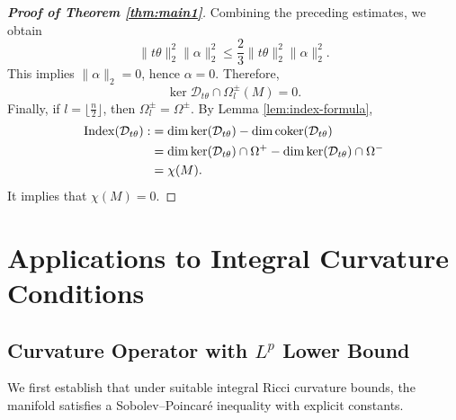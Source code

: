 \documentclass[12pt, twoside]{article}
\theoremstyle{definition}
\numberwithin{equation}{section}
\def\Om{\Omega}
\begin{document}
\begin{proof}[\textbf{Proof of Theorem \ref{thm:main1}}]
		Combining the preceding estimates, we obtain
		\[
		\|t\theta\|_2^2 \|\alpha\|_2^{2}\leq \frac{2}{3} \|t\theta\|_2^2 \|\alpha\|_2^2. \]
		This implies \(\|\alpha\|_2 = 0\), hence \(\alpha = 0\). Therefore,
		\[
		\ker\mathcal{D}_{t\theta}\cap\Omega^{\pm}_{l}(M)=0.
		\]
		Finally, if  $l=\lfloor\frac{n}{2}\rfloor$, then $\Om^{\pm}_{l}=\Om^{\pm}$. By Lemma \ref{lem:index-formula},
		\begin{equation*}
		\begin{split}
		{\rm{Index}}(\mathcal{D}_{t\theta}):&=\dim\ker(\mathcal{D}_{t\theta})-\dim\operatorname{coker}(\mathcal{D}_{t\theta})\\
		&=\dim\ker(\mathcal{D}_{t\theta})\cap\Om^{+}-\dim\operatorname{ker}(\mathcal{D}_{t\theta})\cap\Om^{-}\\
		&=\chi(M).
		\end{split}
		\end{equation*}  
		It implies that \(\chi(M) = 0\).
	\end{proof}
	


\section{Applications to Integral Curvature Conditions}


\subsection{Curvature Operator with \(L^p\) Lower Bound}
	
	We first establish that under suitable integral Ricci curvature bounds, the manifold satisfies a Sobolev--Poincar\'e inequality with explicit constants.
	
\end{document}
